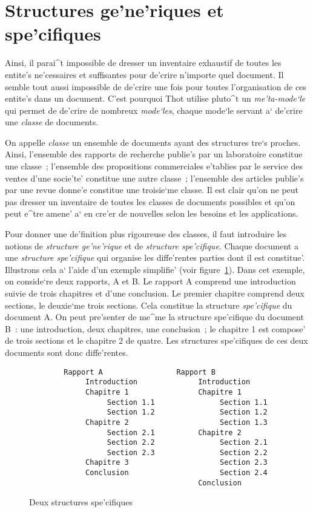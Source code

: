 \section{Structures ge'ne'riques et spe'cifiques}

Ainsi, il parai^t impossible de dresser un inventaire exhaustif de toutes les
entite's ne'cessaires et suffisantes pour de'crire n'importe quel document.
Il semble tout aussi impossible de de'crire une fois pour toutes l'organisation
de ces entite's dans un document. C'est pourquoi Thot utilise pluto^t un
{\em me'ta-mode`le} qui permet de de'crire de nombreux {\em mode`les}, chaque
mode`le servant a` de'crire une {\em classe} de documents.

On appelle {\em classe} un ensemble de documents ayant des structures tre`s
proches. Ainsi, l'ensemble des rapports de recherche publie's par un
laboratoire constitue une classe~; l'ensemble des propositions commerciales
e'tablies par le service des ventes d'une socie'te' constitue une autre classe~;
l'ensemble des articles publie's par une revue donne'e constitue
une troisie`me classe. Il est clair qu'on ne peut pas dresser un inventaire
de toutes les classes de documents possibles et qu'on peut e^tre amene' a` en
cre'er de nouvelles selon les besoins et les applications.

Pour donner une de'finition plus rigoureuse des classes, il faut introduire
les notions de {\em structure ge'ne'rique} et de {\em structure spe'cifique}.
Chaque document a une {\em structure spe'cifique} qui organise
les diffe'rentes parties dont il est constitue'. Illustrons cela a` l'aide
d'un exemple simplifie' (voir figure~\ref{structspec}).
Dans cet exemple, on conside`re deux rapports, A et B.
Le rapport A comprend une introduction suivie de trois chapitres et d'une
conclusion. Le premier chapitre comprend deux sections, le deuxie`me trois
sections. Cela constitue la structure {\em spe'cifique} du document A.
On peut pre'senter de me^me la structure spe'cifique du document B~:
une introduction, deux chapitres, une conclusion~; le chapitre 1 est compose'
de trois sections et le chapitre 2 de quatre. Les structures spe'cifiques de
ces deux documents sont donc diffe'rentes.

\begin{figure}
\begin{verbatim}
        Rapport A                 Rapport B
             Introduction              Introduction
             Chapitre 1                Chapitre 1
                  Section 1.1               Section 1.1
                  Section 1.2               Section 1.2
             Chapitre 2                     Section 1.3
                  Section 2.1          Chapitre 2
                  Section 2.2               Section 2.1
                  Section 2.3               Section 2.2
             Chapitre 3                     Section 2.3
             Conclusion                     Section 2.4
                                       Conclusion
\end{verbatim}
\caption{Deux structures spe'cifiques}
\label{structspec}
\end{figure}

